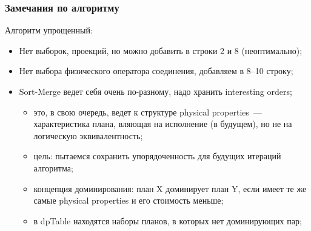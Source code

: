 \documentclass{beamer}
\begin{document}
\begin{frame}
\frametitle{Замечания по алгоритму}
Алгоритм упрощенный:
\begin{itemize}
  \item Нет выборок, проекций, но можно добавить в строки 2 и 8 (неоптимально);
  \item Нет выбора физического оператора соединения, добавляем в 8--10 строку;
  \item Sort-Merge ведет себя очень по-разному, надо хранить interesting orders;
  \begin{itemize}
    \item это, в свою очередь, ведет к структуре physical properties~--- характеристика плана, вляющая на исполнение (в будущем), но не на логическую эквивалентность;
    \item цель: пытаемся сохранить упорядоченность для будущих итераций алгоритма;
    \item концепция доминирования: план X доминирует план Y, если имеет те же самые physical properties и его стоимость меньше;
    \item в dpTable находятся наборы планов, в которых нет доминирующих пар;
  \end{itemize}
\end{itemize}

\end{frame}
\end{document}

